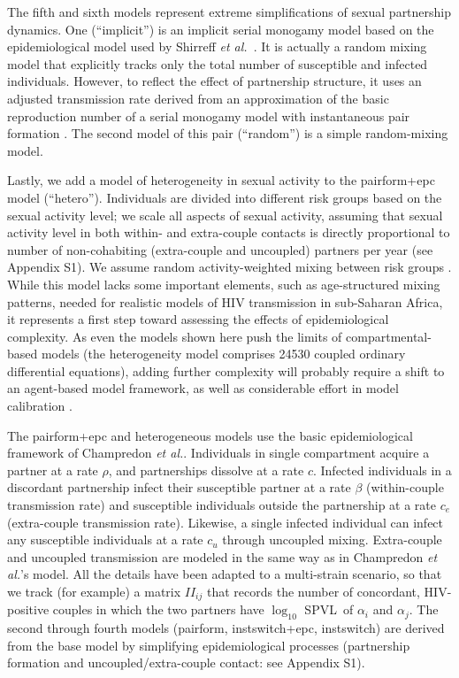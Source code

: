 \documentclass[10pt,letterpaper]{article}
\newcommand{\Lspvl}{$\log_{10}$ SPVL}
\newcommand{\etal}{\textit{et al.}}
\begin{document}
The fifth and sixth models represent extreme simplifications of sexual partnership dynamics.  One (``implicit'') is an implicit serial monogamy model based on the epidemiological model used by Shirreff \etal\ \cite{shirreff_transmission_2011}. It is actually a random mixing model that explicitly tracks only the total number of susceptible and infected individuals. However, to reflect the effect of partnership structure, it uses an adjusted transmission rate derived from an approximation of the basic reproduction number of a serial monogamy model with instantaneous pair formation \cite{hollingsworth_hiv1_2008}. The second model of this pair (``random'') is a simple random-mixing model.

Lastly, we add a model of heterogeneity in sexual activity to the pairform+epc model (``hetero''). Individuals are divided into different risk groups based on the sexual activity level; we scale all aspects of sexual activity, assuming that sexual activity level in both within- and extra-couple contacts is directly proportional to number of non-cohabiting (extra-couple and uncoupled) partners per year \cite{omori2015dynamics} (see Appendix S1). We assume random activity-weighted mixing between risk groups \cite{may_transmission_1988}. While this model lacks some 
important elements, such as age-structured mixing patterns, needed for realistic models of HIV transmission in sub-Saharan Africa, it represents a first step toward assessing the effects of epidemiological complexity. As even the models shown here push the limits of compartmental-based models (the heterogeneity model comprises 24530 coupled ordinary differential equations), adding further complexity will probably require a shift to an agent-based model framework, as well as considerable effort in model calibration \cite{herbeck_hiv_2014,delva_connecting_2016}.

The pairform+epc and heterogeneous models use the basic epidemiological framework of Champredon \etal \cite{champredon_hiv_2013}. Individuals in single compartment acquire a partner at a rate $\rho$, and partnerships dissolve at a rate $c$. Infected individuals in a discordant partnership infect their susceptible partner at a rate $\beta$ (within-couple transmission rate) and susceptible individuals outside the partnership at a rate $c_e$ (extra-couple transmission rate). Likewise, a single infected individual can infect any susceptible individuals at a rate $c_u$ through uncoupled mixing. Extra-couple and uncoupled transmission are modeled in the same way as in Champredon \etal's model. All the details have been adapted to a multi-strain scenario, so that we track (for example) a matrix 
$II_{ij}$ that records the number of concordant, HIV-positive couples in which the two partners have \Lspvl\ of $\alpha_i$ and $\alpha_j$. 
The second through fourth models (pairform, instswitch+epc, instswitch) are derived from the base model by simplifying epidemiological processes (partnership formation and uncoupled/extra-couple contact: see Appendix S1).
\end{document}
